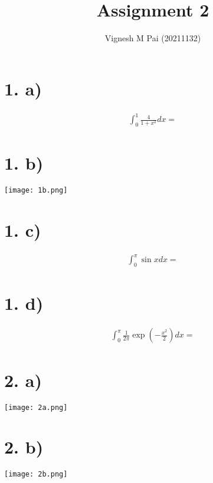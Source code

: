 \documentclass{article}
\title{Assignment 2}
\author{Vignesh M Pai (20211132)}
\date{}
\begin{document}
\maketitle

\section*{1. a)}

\begin{align*}
    \int_0^1 \frac{4}{1 + x^2} dx = 
\end{align*}

\section*{1. b)}

\begin{center}
    \texttt{[image: 1b.png]}
\end{center}

\section*{1. c)}

\begin{align*}
    \int_0^\pi \sin x dx = 
\end{align*}

\section*{1. d)}

\begin{align*}
    \int_0^\pi \frac{1}{2\pi} \exp\left(-\frac{x^2}{2}\right) dx = 
\end{align*}

\section*{2. a)}

\begin{center}
    \texttt{[image: 2a.png]}
\end{center}

\section*{2. b)}

\begin{center}
    \texttt{[image: 2b.png]}
\end{center}
\end{document}
